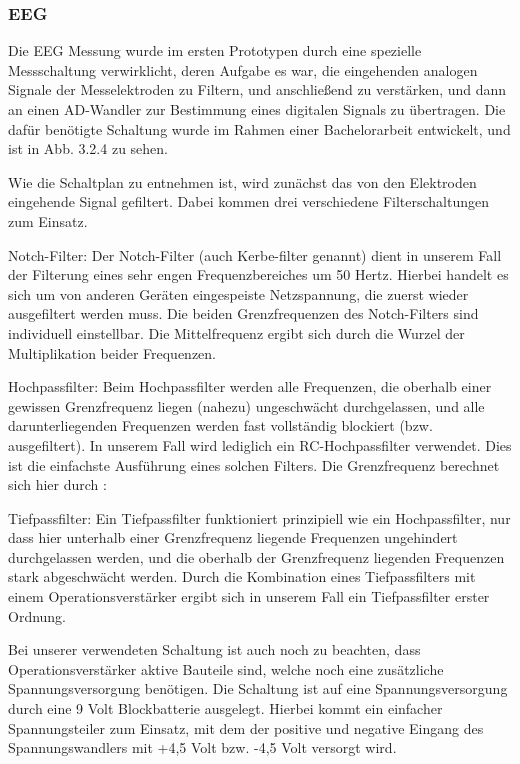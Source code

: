 \subsubsection{EEG} \label{eeg-1}

Die EEG Messung wurde im ersten Prototypen durch eine spezielle Messschaltung verwirklicht, deren Aufgabe es war, die eingehenden analogen Signale der Messelektroden zu Filtern, und anschließend zu verstärken, und dann an einen AD-Wandler zur Bestimmung eines digitalen Signals zu übertragen. Die dafür benötigte Schaltung wurde im Rahmen einer Bachelorarbeit entwickelt, und ist in Abb. 3.2.4 zu sehen. 


Wie die Schaltplan zu entnehmen ist, wird zunächst das von den Elektroden  eingehende Signal  gefiltert. Dabei kommen drei verschiedene Filterschaltungen zum Einsatz. 

Notch-Filter:
Der Notch-Filter (auch Kerbe-filter genannt) dient in unserem Fall der Filterung eines sehr engen Frequenzbereiches um 50 Hertz. Hierbei handelt es sich um von anderen Geräten eingespeiste Netzspannung, die zuerst wieder ausgefiltert werden muss. Die beiden Grenzfrequenzen des Notch-Filters sind individuell einstellbar. Die Mittelfrequenz ergibt sich durch die Wurzel der Multiplikation beider Frequenzen.  

Hochpassfilter:
Beim Hochpassfilter werden alle Frequenzen, die oberhalb einer gewissen Grenzfrequenz liegen (nahezu) ungeschwächt durchgelassen, und alle darunterliegenden Frequenzen werden fast vollständig blockiert (bzw. ausgefiltert). In unserem Fall wird lediglich ein RC-Hochpassfilter verwendet. Dies ist die einfachste Ausführung eines solchen Filters. Die Grenzfrequenz berechnet sich hier durch :


Tiefpassfilter:
Ein Tiefpassfilter funktioniert prinzipiell wie ein Hochpassfilter, nur dass hier unterhalb einer Grenzfrequenz liegende Frequenzen ungehindert durchgelassen werden, und die oberhalb der Grenzfrequenz liegenden Frequenzen stark abgeschwächt werden. Durch die Kombination eines Tiefpassfilters mit einem Operationsverstärker ergibt sich in unserem Fall ein Tiefpassfilter erster Ordnung.

Bei unserer verwendeten Schaltung ist auch noch zu beachten, dass Operationsverstärker aktive Bauteile sind, welche noch eine zusätzliche Spannungsversorgung benötigen. Die Schaltung ist auf eine Spannungsversorgung durch eine 9 Volt Blockbatterie ausgelegt. Hierbei kommt ein einfacher Spannungsteiler zum Einsatz, mit dem der positive und  negative Eingang des Spannungswandlers mit +4,5 Volt bzw. -4,5 Volt versorgt wird. 

